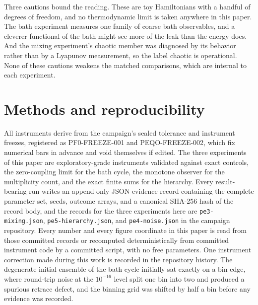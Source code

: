 \documentclass[aps,pre,reprint,nofootinbib]{revtex4-2}
\begin{document}
Three cautions bound the reading.  These are toy Hamiltonians with a
handful of degrees of freedom, and no thermodynamic limit is taken
anywhere in this paper.  The bath experiment measures one family of
coarse bath observables, and a cleverer functional of the bath might see
more of the leak than the energy does.  And the mixing experiment's
chaotic member was diagnosed by its behavior rather than by a Lyapunov
measurement, so the label chaotic is operational.  None of these cautions
weakens the matched comparisons, which are internal to each experiment.

\section{Methods and reproducibility}
\label{sec:methods}

All instruments derive from the campaign's sealed tolerance and
instrument freezes, registered as PF0-FREEZE-001 and PEQO-FREEZE-002,
which fix numerical bars in advance and void themselves if edited.  The
three experiments of this paper are exploratory-grade instruments
validated against exact controls, the zero-coupling limit for the bath
cycle, the monotone observer for the multiplicity count, and the exact
finite sums for the hierarchy.  Every result-bearing run writes an
append-only JSON evidence record containing the complete parameter set,
seeds, outcome arrays, and a canonical SHA-256 hash of the record body,
and the records for the three experiments here are
\texttt{pe3-mixing.json}, \texttt{pe5-hierarchy.json}, and
\texttt{pe4-noise.json} in the campaign repository.  Every number and
every figure coordinate in this paper is read from those committed
records or recomputed deterministically from committed instrument code by
a committed script, with no free parameters.  One instrument correction
made during this work is recorded in the repository history.  The
degenerate initial ensemble of the bath cycle initially sat exactly on a
bin edge, where round-trip noise at the $10^{-16}$ level split one bin
into two and produced a spurious retrace defect, and the binning grid was
shifted by half a bin before any evidence was recorded.
\end{document}
